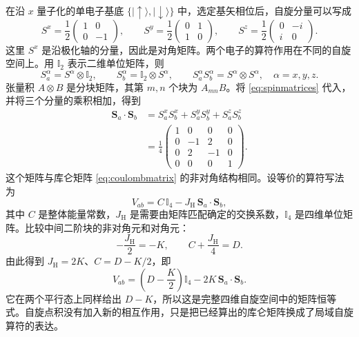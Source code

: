 \documentclass[UTF8,11pt,a4paper,fontset=fandol]{ctexart}
\newcommand{\ket}[1]{\lvert #1\rangle}
\newcommand{\id}{\mathbb I}
\begin{document}
在沿 $x$ 量子化的单电子基底 $\{\ket{\uparrow},\ket{\downarrow}\}$ 中，选定基矢相位后，自旋分量可以写成
\begin{equation}
S^x=\frac12\begin{pmatrix}1&0\\0&-1\end{pmatrix},
\qquad
S^y=\frac12\begin{pmatrix}0&1\\1&0\end{pmatrix},
\qquad
S^z=\frac12\begin{pmatrix}0&-i\\i&0\end{pmatrix}.
\label{eq:spinmatrices}
\end{equation}
这里 $S^x$ 是沿极化轴的分量，因此是对角矩阵。两个电子的算符作用在不同的自旋空间上。用 $\id_2$ 表示二维单位矩阵，则
\begin{equation}
S_a^\alpha=S^\alpha\otimes\id_2,\qquad
S_b^\alpha=\id_2\otimes S^\alpha,\qquad
S_a^\alpha S_b^\alpha=S^\alpha\otimes S^\alpha,
\quad \alpha=x,y,z.
\end{equation}
张量积 $A\otimes B$ 是分块矩阵，其第 $m,n$ 个块为 $A_{mn}B$。将 \eqref{eq:spinmatrices} 代入，并将三个分量的乘积相加，得到
\begin{equation}
\begin{aligned}
\mathbf S_a\cdot\mathbf S_b
&=S_a^xS_b^x+S_a^yS_b^y+S_a^zS_b^z\\
&=\frac14
\begin{pmatrix}
1&0&0&0\\
0&-1&2&0\\
0&2&-1&0\\
0&0&0&1
\end{pmatrix}.
\end{aligned}
\label{eq:dotmatrix}
\end{equation}
这个矩阵与库仑矩阵 \eqref{eq:coulombmatrix} 的非对角结构相同。设等价的算符写法为
\begin{equation}
V_{ab}=C\,\id_4-J_{\mathrm H}\,\mathbf S_a\cdot\mathbf S_b,
\end{equation}
其中 $C$ 是整体能量常数，$J_{\mathrm H}$ 是需要由矩阵匹配确定的交换系数，$\id_4$ 是四维单位矩阵。比较中间二阶块的非对角元和对角元：
\begin{equation}
-\frac{J_{\mathrm H}}2=-K,\qquad
C+\frac{J_{\mathrm H}}4=D.
\end{equation}
由此得到 $J_{\mathrm H}=2K$、$C=D-K/2$，即
\begin{equation}
\boxed{
V_{ab}=\left(D-\frac K2\right)\id_4
-2K\,\mathbf S_a\cdot\mathbf S_b.
}
\label{eq:pairspin}
\end{equation}
它在两个平行态上同样给出 $D-K$，所以这是完整四维自旋空间中的矩阵恒等式。自旋点积没有加入新的相互作用，只是把已经算出的库仑矩阵换成了局域自旋算符的表达。
\end{document}
